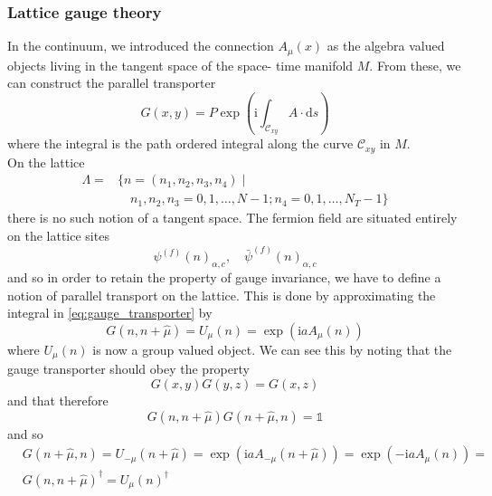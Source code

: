 \documentclass[a4paper,10pt]{article}
\begin{document}
\subsubsection{Lattice gauge theory}\label{sec:lgt}
In the continuum, we introduced the connection $A_\mu(x)$ as the algebra valued objects living in the tangent space of the space- time manifold $M$. From these, we can construct the parallel transporter
\begin{equation}\label{eq:gauge_transporter}
G(x, y)=P \exp \left(\mathrm{i} \int_{\mathcal{C}_{x y}} A \cdot \mathrm{d} s\right)
\end{equation}
where the integral is the path ordered integral along the curve $\mathcal{C}_{x y}$ in $M$.\\On the lattice
\begin{equation}
\begin{aligned}
\Lambda=&\{n=\left(n_{1}, n_{2}, n_{3}, n_{4}\right) \mid \\
&\quad n_{1}, n_{2}, n_{3}=0,1, \ldots, N-1 ; n_{4}=0,1, \ldots, N_{T}-1\}
\end{aligned}
\end{equation}
there is no such notion of a tangent space. The fermion field are situated entirely on the lattice sites
\begin{equation}
\psi^{(f)}(n)_{\alpha, c}, \quad \bar{\psi}^{(f)}(n)_{\alpha, c}
\end{equation}
and so in order to retain the property of gauge invariance, we have to define a notion of parallel transport on the lattice. This is done by approximating the integral in \eqref{eq:gauge_transporter} by
\begin{equation}\label{eq:linkVariable_exponential}
G(n,n+\hat{\mu}) = U_{\mu}(n)=\exp \left(\mathrm{i} a A_{\mu}(n)\right)
\end{equation}
where $U_{\mu}(n)$ is now a group valued object. We can see this by noting that the gauge transporter should obey the property
\begin{equation}
G(x,y)G(y,z) = G(x,z)
\end{equation}
and that therefore 
\begin{equation}
G(n,n+\hat{\mu})G(n+\hat{\mu},n) = \mathbb{1}
\end{equation}
and so
\begin{equation}
\begin{aligned}
&G(n+\hat{\mu},n) = U_{-\mu}(n+\hat{\mu})=\exp \left(\mathrm{i} a A_{-\mu}(n+\hat{\mu})\right) = \exp \left(-\mathrm{i} a A_{\mu}(n)\right)=\\ &G(n,n+\hat{\mu})^\dagger = U_{\mu}(n)^\dagger
\end{aligned}
\end{equation}
\end{document}
